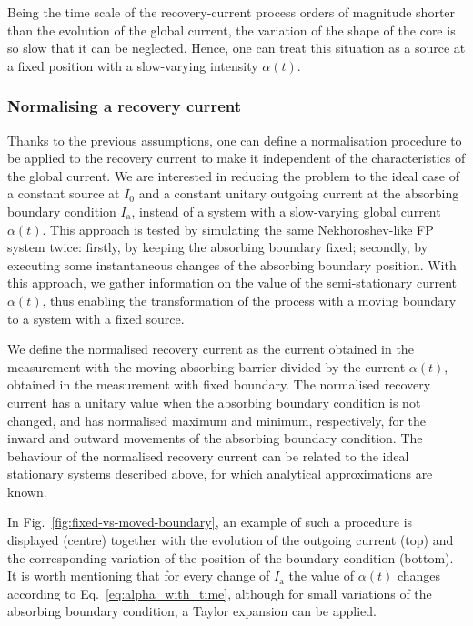 Being the time scale of the recovery-current process orders of magnitude shorter than the evolution of the global current, the variation of the shape of the core is so slow that it can be neglected. Hence, one can treat this situation as a source at a fixed position with a slow-varying intensity $\alpha(t)$. 


\subsubsection{Normalising a recovery current}


Thanks to the previous assumptions, one can define a normalisation procedure to be applied to the recovery current to make it independent of the characteristics of the global current. We are interested in reducing the problem to the ideal case of a constant source at $I_0$ and a constant unitary outgoing current at the absorbing boundary condition $I_\mathrm{a}$, instead of a system with a slow-varying global current $\alpha(t)$. This approach is tested by simulating the same Nekhoroshev-like FP system twice: firstly, by keeping the absorbing boundary fixed; secondly, by executing some instantaneous changes of the absorbing boundary position. With this approach, we gather information on the value of the semi-stationary current $\alpha(t)$, thus enabling the transformation of the process with a moving boundary to a system with a fixed source.

We define the normalised recovery current as the current obtained in the measurement with the moving absorbing barrier divided by the current $\alpha(t)$, obtained in the measurement with fixed boundary. The normalised recovery current has a unitary value when the absorbing boundary condition is not changed, and has normalised maximum and minimum, respectively, for the inward and outward movements of the absorbing boundary condition. The behaviour of the normalised recovery current can be related to the ideal stationary systems described above, for which analytical approximations are known.

In Fig.~\ref{fig:fixed-vs-moved-boundary}, an example of such a procedure is displayed (centre) together with the evolution of the outgoing current (top) and the corresponding variation of the position of the boundary condition (bottom). It is worth mentioning that for every change of $I_\mathrm{a}$ the value of $\alpha(t)$ changes according to Eq.~\eqref{eq:alpha_with_time}, although for small variations of the absorbing boundary condition, a Taylor expansion can be applied.

